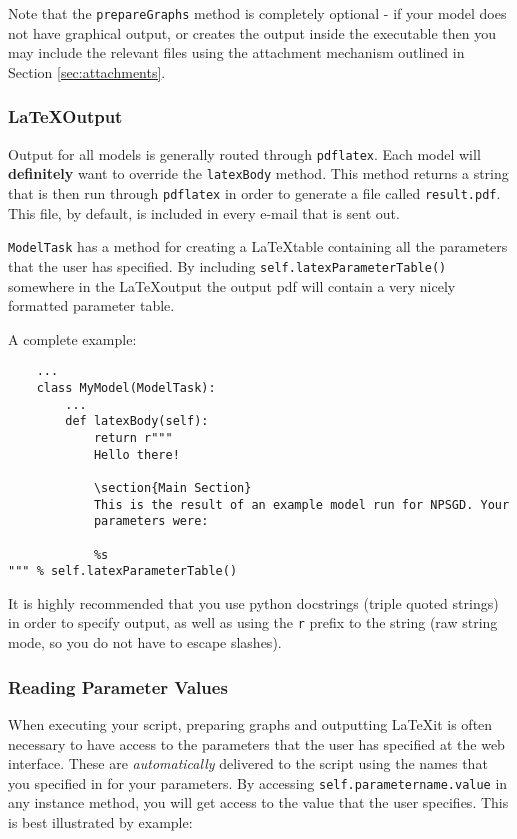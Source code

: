 \documentclass{article}
\newcommand{\mpath}[1]{\texttt{#1}}
\newcommand{\mclass}[1]{\texttt{#1}}
\begin{document}
Note that the \texttt{prepareGraphs} method is completely optional - if your
model does not have graphical output, or creates the output inside the
executable then you may include the relevant files using the attachment mechanism
outlined in Section \ref{sec:attachments}.


\subsubsection{\LaTeX Output}
\label{sec:LatexOutput}
Output for all models is generally routed through \texttt{pdflatex}. Each model will
\textbf{definitely} want to override the \texttt{latexBody} method. This method
returns a string that is then run through \texttt{pdflatex} in order to generate a file
called \mpath{result.pdf}. This file, by default, is included in every e-mail
that is sent out.

\mclass{ModelTask} has a method for creating a \LaTeX table containing
all the parameters that the user has specified. By including
\texttt{self.latexParameterTable()} somewhere in the \LaTeX output the output
pdf will contain a very nicely formatted parameter table.

A complete example:
\begin{lstlisting}
    ...
    class MyModel(ModelTask):
        ...
        def latexBody(self):
            return r"""
            Hello there!

            \section{Main Section}
            This is the result of an example model run for NPSGD. Your
            parameters were:

            %s
""" % self.latexParameterTable()
\end{lstlisting}

It is highly recommended that you use python docstrings (triple quoted strings)
in order to specify output, as well as using the \texttt{r} prefix to the string
(raw string mode, so you do not have to escape slashes).

\subsubsection{Reading Parameter Values}
When executing your script, preparing graphs and outputting \LaTeX it is often
necessary to have access to the parameters that the user has specified at the
web interface. These are \textit{automatically} delivered to the script using
the names that you specified in for your parameters. By accessing
\texttt{self.parametername.value} in any instance method, you will get access to
the value that the user specifies. This is best illustrated by example:
\end{document}
